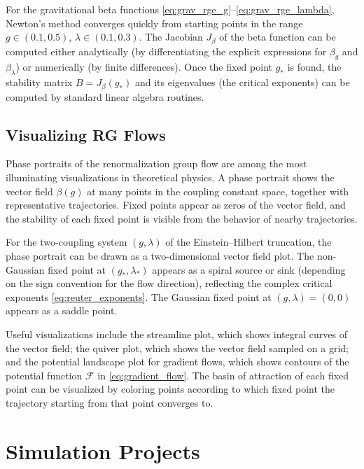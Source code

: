 \documentclass[11pt, twoside, openright]{book}
\theoremstyle{dotted}
\theoremstyle{definition}
\begin{document}
For the gravitational beta functions \eqref{eq:grav_rge_g}--\eqref{eq:grav_rge_lambda},
Newton's method converges quickly from starting points in the range $g \in (0.1, 0.5)$,
$\lambda \in (0.1, 0.3)$. The Jacobian $J_\beta$ of the beta function can be computed
either analytically (by differentiating the explicit expressions for $\beta_g$ and
$\beta_\lambda$) or numerically (by finite differences). Once the fixed point
$g_*$ is found, the stability matrix $B = J_\beta(g_*)$ and its eigenvalues
(the critical exponents) can be computed by standard linear algebra routines.

\section{Visualizing RG Flows}

Phase portraits of the renormalization group flow are among the most illuminating
visualizations in theoretical physics. A phase portrait shows the vector field
$\beta(g)$ at many points in the coupling constant space, together with representative
trajectories. Fixed points appear as zeros of the vector field, and the stability
of each fixed point is visible from the behavior of nearby trajectories.

For the two-coupling system $(g, \lambda)$ of the Einstein--Hilbert truncation,
the phase portrait can be drawn as a two-dimensional vector field plot. The
non-Gaussian fixed point at $(g_*, \lambda_*)$ appears as a spiral source or sink
(depending on the sign convention for the flow direction), reflecting the complex
critical exponents \eqref{eq:reuter_exponents}. The Gaussian fixed point at
$(g, \lambda) = (0, 0)$ appears as a saddle point.

Useful visualizations include the streamline plot, which shows integral curves of
the vector field; the quiver plot, which shows the vector field sampled on a grid;
and the potential landscape plot for gradient flows, which shows contours of the
potential function $\mathcal{F}$ in \eqref{eq:gradient_flow}. The basin of
attraction of each fixed point can be visualized by coloring points according to
which fixed point the trajectory starting from that point converges to.

\chapter{Simulation Projects}
\label{ch:simulation}
\end{document}
